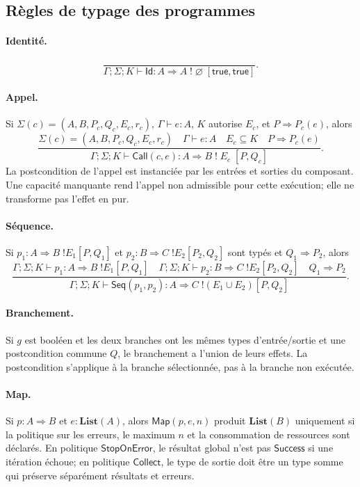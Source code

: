 \documentclass[11pt,a4paper]{article}
\theoremstyle{definition}
\theoremstyle{plain}
\theoremstyle{remark}
\begin{document}
\subsection{Règles de typage des programmes}
\paragraph{Identité.}
\[
\frac{}{\Gamma;\Sigma;K\vdash \mathsf{Id}:A\Rightarrow A\;!\;\varnothing\;[\mathsf{true},\mathsf{true}]}.
\]
\paragraph{Appel.} Si $\Sigma(c)=(A,B,P_c,Q_c,E_c,r_c)$, $\Gamma\vdash e:A$, $K$ autorise $E_c$, et $P\Rightarrow P_c(e)$, alors
\[
\frac{\Sigma(c)=(A,B,P_c,Q_c,E_c,r_c)\quad\Gamma\vdash e:A\quad E_c\subseteq K\quad P\Rightarrow P_c(e)}
{\Gamma;\Sigma;K\vdash \mathsf{Call}(c,e):A\Rightarrow B\;!\;E_c\;[P,Q_c]}.
\]
La postcondition de l'appel est instanciée par les entrées et sorties du composant. Une capacité manquante rend l'appel non admissible pour cette exécution; elle ne transforme pas l'effet en pur.
\paragraph{Séquence.} Si $p_1:A\Rightarrow B\;!E_1[P,Q_1]$ et $p_2:B\Rightarrow C\;!E_2[P_2,Q_2]$ sont typés et $Q_1\Rightarrow P_2$, alors
\[
\frac{\Gamma;\Sigma;K\vdash p_1:A\Rightarrow B\;!E_1[P,Q_1]\quad
\Gamma;\Sigma;K\vdash p_2:B\Rightarrow C\;!E_2[P_2,Q_2]\quad Q_1\Rightarrow P_2}
{\Gamma;\Sigma;K\vdash \mathsf{Seq}(p_1,p_2):A\Rightarrow C\;!(E_1\cup E_2)[P,Q_2]}.
\]
\paragraph{Branchement.} Si $g$ est booléen et les deux branches ont les mêmes types d'entrée/sortie et une postcondition commune $Q$, le branchement a l'union de leurs effets. La postcondition s'applique à la branche sélectionnée, pas à la branche non exécutée.
\paragraph{Map.} Si $p:A\Rightarrow B$ et $e:\mathbf{List}(A)$, alors $\mathsf{Map}(p,e,n)$ produit $\mathbf{List}(B)$ uniquement si la politique sur les erreurs, le maximum $n$ et la consommation de ressources sont déclarés. En politique $\mathsf{StopOnError}$, le résultat global n'est pas $\mathsf{Success}$ si une itération échoue; en politique $\mathsf{Collect}$, le type de sortie doit être un type somme qui préserve séparément résultats et erreurs.
\end{document}
